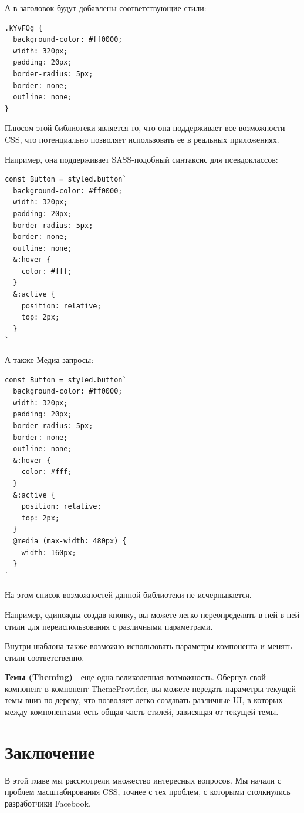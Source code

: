 А в заголовок будут добавлены соответствующие стили:

\begin{lstlisting}
.kYvFOg {
  background-color: #ff0000;
  width: 320px;
  padding: 20px;
  border-radius: 5px;
  border: none;
  outline: none;
}
\end{lstlisting}

Плюсом этой библиотеки является то, что она поддерживает все возможности CSS, что потенциально позволяет использовать ее в реальных приложениях.

Например, она поддерживает SASS-подобный синтаксис для псевдоклассов:

\begin{lstlisting}
const Button = styled.button`
  background-color: #ff0000;
  width: 320px;
  padding: 20px;
  border-radius: 5px;
  border: none;
  outline: none;
  &:hover {
    color: #fff;
  }
  &:active {
    position: relative;
    top: 2px;
  }
`
\end{lstlisting}

А также Медиа запросы:

\begin{lstlisting}
const Button = styled.button`
  background-color: #ff0000;
  width: 320px;
  padding: 20px;
  border-radius: 5px;
  border: none;
  outline: none;
  &:hover {
    color: #fff;
  }
  &:active {
    position: relative;
    top: 2px;
  }
  @media (max-width: 480px) {
    width: 160px;
  }
`
\end{lstlisting}

На этом список возможностей данной библиотеки не исчерпывается.

Например, единожды создав кнопку, вы можете легко переопределять в ней в ней стили для переиспользования с различными параметрами.

Внутри шаблона также возможно использовать параметры компонента и менять стили соответственно.

\textbf{Темы (Theming)} - еще одна великолепная возможность. Обернув свой компонент в компонент ThemeProvider, вы можете передать параметры текущей темы вниз по дереву, что позволяет легко создавать различные UI, в которых между компонентами есть общая часть стилей, зависящая от текущей темы.

\section{Заключение}

В этой главе мы рассмотрели множество интересных вопросов. Мы начали с проблем масштабирования CSS, точнее с тех проблем, с которыми столкнулись разработчики Facebook.

